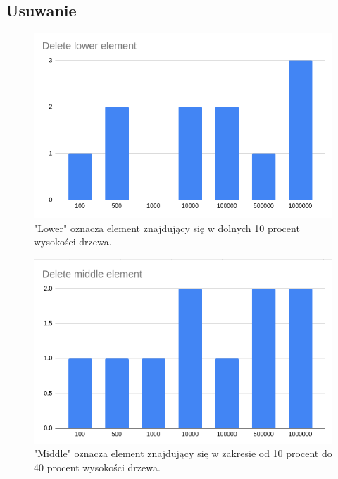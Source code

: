 \documentclass{article}
\begin{document}
\subsection*{Usuwanie}

\begin{figure}[H]
    \centering
    \includegraphics[width=\textwidth]{"../assets/4_6.png"}
    \caption{"Lower" oznacza element znajdujący się w dolnych 10 procent wysokości drzewa.}
    \label{fig:4_6}
\end{figure}

\begin{figure}[H]
    \centering
    \includegraphics[width=\textwidth]{"../assets/4_7.png"}
    \caption{"Middle" oznacza element znajdujący się w zakresie od 10 procent do 40 procent wysokości drzewa. }
    \label{fig:4_7}
\end{figure}
\end{document}

